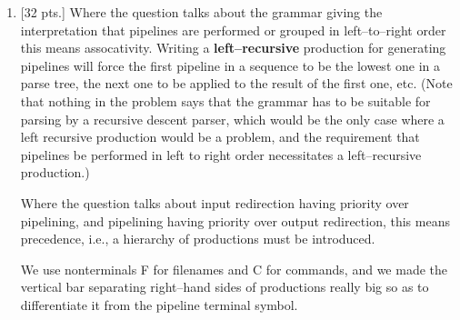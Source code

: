\documentclass[11pt,fleqn]{article}
\begin{document}
\begin{enumerate}
    \item {[32 pts.]} Where the question talks about the grammar giving the
          interpretation that pipelines are performed or grouped in
          left--to--right order this means assocativity.  Writing a
          \textbf{left--recursive} production for generating pipelines will
          force the first pipeline in a sequence to be the lowest one in a
          parse tree, the next one to be applied to the result of the first
          one, etc.  (Note that nothing in the problem says that the grammar
          has to be suitable for parsing by a recursive descent parser,
          which would be the only case where a left recursive production
          would be a problem, and the requirement that pipelines be
          performed in left to right order necessitates a left--recursive
          production.)

          Where the question talks about input redirection having priority
          over pipelining, and pipelining having priority over output
          redirection, this means precedence, i.e., a hierarchy of
          productions must be introduced.

          \renewcommand{\midspc}{\mbox{\huge \ensuremath{\ \mid \ }}}

          We use nonterminals F for filenames and C for commands, and we
          made the vertical bar separating right--hand sides of productions
          {\Large really big} so as to differentiate it from the pipeline
          terminal symbol.

          \hspace{.2in}
          \begin{minipage}[t]{6in}

            \begin{grammar}[2]

              \production{S}{T \midspc T \ \: \texttt{>} \ \: F}
              \\

              \production{T}{T \ \: \texttt{|\&} \ \: C \midspc U}
              \\

              \production{U}{C \ \: \texttt{<} \ \: F \midspc C}
              \\

              \production{F}{\texttt{f} \midspc \texttt{g} \midspc \texttt{h}}
              \\

              \production{C}{\texttt{a} \midspc \texttt{b} \midspc \texttt{c}}
              \\


\end{grammar}
\end{minipage}
\end{enumerate}
\end{document}
